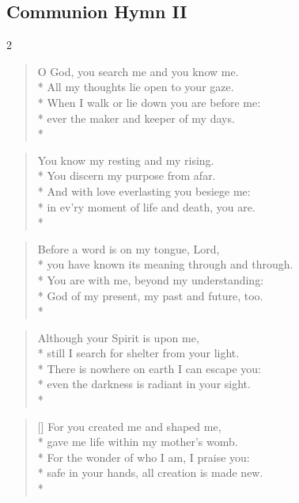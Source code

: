 \documentclass[12pt]{article}
\newcounter{count}
\newcommand\printcount{\addtocounter{count}{1}\thecount}
\begin{document}
\begin{center}
\subsection*{Communion Hymn II}
\end{center}
\begin{multicols}{2}
\setcounter{count}{0}
\begin{verse}
\flagverse{\printcount.} O God, you search me and you know me.\\*
All my thoughts lie open to your gaze.\\*
When I walk or lie down you are before me:\\*
ever the maker and keeper of my days.\\*
\end{verse}

\begin{verse}
\flagverse{\printcount.} You know my resting and my rising.\\*
You discern my purpose from afar.\\*
And with love everlasting you besiege me:\\*
in ev'ry moment of life and death, you are.\\*
\end{verse}

\begin{verse}
\flagverse{\printcount.} Before a word is on my tongue, Lord,\\*
you have known its meaning through and through.\\*
You are with me, beyond my understanding:\\*
God of my present, my past and future, too.\\*
\end{verse}

\begin{verse}
\flagverse{\printcount.} Although your Spirit is upon me,\\*
still I search for shelter from your light.\\*
There is nowhere on earth I can escape you:\\*
even the darkness is radiant in your sight.\\*
\end{verse}
\end{multicols}

\settowidth{\versewidth}{safe in your hands, all creation is made new.}
\begin{verse}[\versewidth]
\flagverse{\printcount.} For you created me and shaped me,\\*
gave me life within my mother's womb.\\*
For the wonder of who I am, I praise you:\\*
safe in your hands, all creation is made new.\\*
\end{verse}
\end{document}
